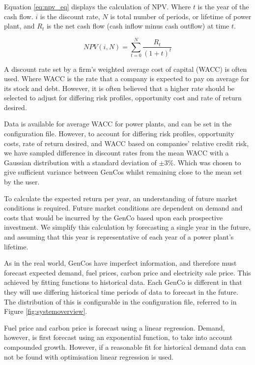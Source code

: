 Equation \ref{eq:npv_eq} displays the calculation of NPV. Where $t$ is the year of the cash flow. $i$ is the discount rate, $N$ is total number of periods, or lifetime of power plant, and $R_t$ is the net cash flow (cash inflow minus cash outflow) at time $t$.

\begin{equation} \label{eq:npv_eq}
NPV(i, N) = \sum_{t=0}^{N}\frac{R_t}{(1+t)^t}
\end{equation}

A discount rate set by a firm's weighted average cost of capital (WACC) is often used. Where WACC is the rate that a company is expected to pay on average for its stock and debt. However, it is often believed that a higher rate should be selected to adjust for differing risk profiles, opportunity cost and rate of return desired.

Data is available for average WACC for power plants, and can be set in the configuration file. However, to account for differing risk profiles, opportunity costs, rate of return desired, and WACC based on companies' relative credit risk, we have sampled difference in discount rates from the mean WACC with a Gaussian distribution with a standard deviation of $\pm3\%$. Which was chosen to give sufficient variance between GenCos whilst remaining close to the mean set by the user.

To calculate the expected return per year, an understanding of future market conditions is required. Future market conditions are dependent on demand and costs that would be incurred by the GenCo based upon each prospective investment. We simplify this calculation by forecasting a single year in the future, and assuming that this year is representative of each year of a power plant's lifetime.

As in the real world, GenCos have imperfect information, and therefore must forecast expected demand, fuel prices, carbon price and electricity sale price. This achieved by fitting functions to historical data. Each GenCo is different in that they will use differing historical time periods of data to forecast in the future. The distribution of this is configurable in the configuration file, referred to in Figure \ref{fig:systemoverview}.

Fuel price and carbon price is forecast using a linear regression. Demand, however, is first forecast using an exponential function, to take into account compounded growth. However, if a reasonable fit for historical demand data can not be found with optimisation linear regression is used.

